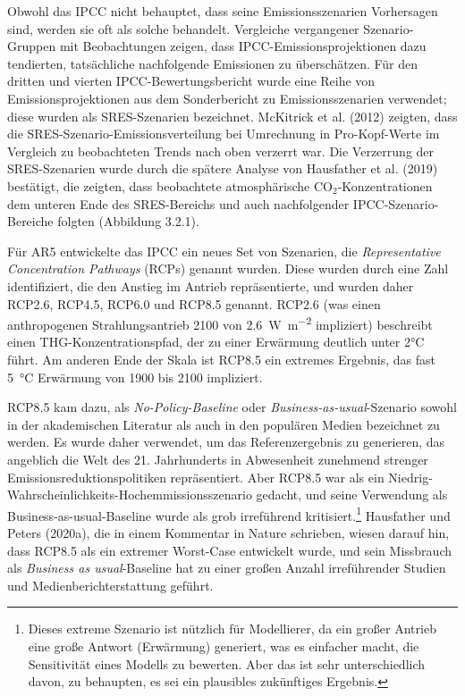 \documentclass[12pt,paper=a4,DIV=12,parskip=never,chapterprefix=false,headings=standardclasses]{scrreprt}
\numberwithin{figure}{chapter}
\begin{document}
Obwohl das IPCC nicht behauptet, dass seine Emissionsszenarien Vorhersagen sind, werden sie oft als solche behandelt. Vergleiche vergangener Szenario-Gruppen mit Beobachtungen zeigen, dass IPCC-Emissionsprojektionen dazu tendierten, tatsächliche nachfolgende Emissionen zu überschätzen. Für den dritten und vierten IPCC-Bewertungsbericht wurde eine Reihe von Emissionsprojektionen aus dem Sonderbericht zu Emissionsszenarien verwendet; diese wurden als SRES-Szenarien bezeichnet. McKitrick et al. (2012) zeigten, dass die SRES-Szenario-Emissionsverteilung bei Umrechnung in Pro-Kopf-Werte im Vergleich zu beobachteten Trends nach oben verzerrt war. Die Verzerrung der SRES-Szenarien wurde durch die spätere Analyse von Hausfather et al. (2019) bestätigt, die zeigten, dass beobachtete atmosphärische CO$_2$-Konzentrationen dem unteren Ende des SRES-Bereichs und auch nachfolgender IPCC-Szenario-Bereiche folgten (Abbildung 3.2.1).

Für AR5 entwickelte das IPCC ein neues Set von Szenarien, die \emph{Representative Concentration Pathways} (RCPs) genannt wurden. Diese wurden durch eine Zahl identifiziert, die den Anstieg im Antrieb repräsentierte, und wurden daher RCP2.6, RCP4.5, RCP6.0 und RCP8.5 genannt. RCP2.6 (was einen anthropogenen Strahlungsantrieb 2100 von \SI{2.6}{\watt\per\square\meter} impliziert) beschreibt einen THG-Konzentrationspfad, der zu einer Erwärmung deutlich unter 2°C führt. Am anderen Ende der Skala ist RCP8.5 ein extremes Ergebnis, das fast \SI{5}{\celsius} Erwärmung von 1900 bis 2100 impliziert.

RCP8.5 kam dazu, als \emph{No-Policy-Baseline} oder \emph{Business-as-usual}-Szenario sowohl in der akademischen Literatur als auch in den populären Medien bezeichnet zu werden. Es wurde daher verwendet, um das Referenzergebnis zu generieren, das angeblich die Welt des 21. Jahrhunderts in Abwesenheit zunehmend strenger Emissionsreduktionspolitiken repräsentiert. Aber RCP8.5 war als ein Niedrig-Wahrscheinlichkeits-Hochemmissionsszenario gedacht, und seine Verwendung als Business-as-usual-Baseline wurde als grob irreführend kritisiert.\footnote{Dieses extreme Szenario ist nützlich für Modellierer, da ein großer Antrieb eine große Antwort (Erwärmung) generiert, was es einfacher macht, die Sensitivität eines Modells zu bewerten. Aber das ist sehr unterschiedlich davon, zu behaupten, es sei ein plausibles zukünftiges Ergebnis.} Hausfather und Peters (2020a), die in einem Kommentar in Nature schrieben, wiesen darauf hin, dass RCP8.5 als ein extremer Worst-Case entwickelt wurde, und sein Missbrauch als \emph{Business as usual}-Baseline hat zu einer großen Anzahl irreführender Studien und Medienberichterstattung geführt.
\end{document}
